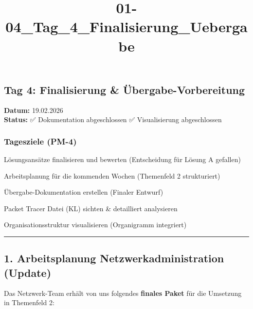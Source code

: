\documentclass[
]{article}
\title{01-04\_Tag\_4\_Finalisierung\_Uebergabe}
\author{}
\date{}
\begin{document}
\maketitle

\subsection{Tag 4: Finalisierung \&
Übergabe-Vorbereitung}\label{tag-4-finalisierung-uxfcbergabe-vorbereitung}

\textbf{Datum:} 19.02.2026\\
\textbf{Status:} ✅ Dokumentation abgeschlossen \textbar{} ✅
Visualisierung abgeschlossen

\subsubsection{Tagesziele (PM-4)}\label{tagesziele-pm-4}

Lösungsansätze finalisieren und bewerten (Entscheidung für Lösung A
gefallen)

Arbeitsplanung für die kommenden Wochen (Themenfeld 2 strukturiert)

Übergabe-Dokumentation erstellen (Finaler Entwurf)

Packet Tracer Datei (KL) sichten \& detailliert analysieren

Organisationsstruktur visualisieren (Organigramm integriert)

\begin{center}\rule{0.5\linewidth}{0.5pt}\end{center}

\subsection{1. Arbeitsplanung Netzwerkadministration
(Update)}\label{arbeitsplanung-netzwerkadministration-update}

Das Netzwerk-Team erhält von uns folgendes \textbf{finales Paket} für
die Umsetzung in Themenfeld 2:
\end{document}

